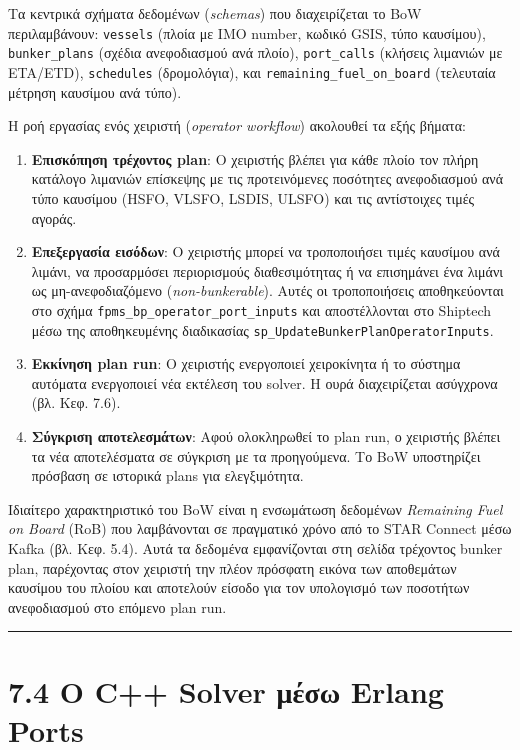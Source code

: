 Τα κεντρικά σχήματα δεδομένων (\emph{schemas}) που διαχειρίζεται το BoW
περιλαμβάνουν: \texttt{vessels} (πλοία με IMO number, κωδικό GSIS, τύπο
καυσίμου), \texttt{bunker\_plans} (σχέδια ανεφοδιασμού ανά πλοίο),
\texttt{port\_calls} (κλήσεις λιμανιών με ETA/ETD), \texttt{schedules}
(δρομολόγια), και \texttt{remaining\_fuel\_on\_board} (τελευταία μέτρηση
καυσίμου ανά τύπο).

Η ροή εργασίας ενός χειριστή (\emph{operator workflow}) ακολουθεί τα
εξής βήματα:

\begin{enumerate}
\def\labelenumi{\arabic{enumi}.}
\item
  \textbf{Επισκόπηση τρέχοντος plan}: Ο χειριστής βλέπει για κάθε πλοίο
  τον πλήρη κατάλογο λιμανιών επίσκεψης με τις προτεινόμενες ποσότητες
  ανεφοδιασμού ανά τύπο καυσίμου (HSFO, VLSFO, LSDIS, ULSFO) και τις
  αντίστοιχες τιμές αγοράς.
\item
  \textbf{Επεξεργασία εισόδων}: Ο χειριστής μπορεί να τροποποιήσει τιμές
  καυσίμου ανά λιμάνι, να προσαρμόσει περιορισμούς διαθεσιμότητας ή να
  επισημάνει ένα λιμάνι ως μη-ανεφοδιαζόμενο (\emph{non-bunkerable}).
  Αυτές οι τροποποιήσεις αποθηκεύονται στο σχήμα
  \texttt{fpms\_bp\_operator\_port\_inputs} και αποστέλλονται στο
  Shiptech μέσω της αποθηκευμένης διαδικασίας
  \texttt{sp\_UpdateBunkerPlanOperatorInputs}.
\item
  \textbf{Εκκίνηση plan run}: Ο χειριστής ενεργοποιεί χειροκίνητα ή το
  σύστημα αυτόματα ενεργοποιεί νέα εκτέλεση του solver. Η ουρά
  διαχειρίζεται ασύγχρονα (βλ. Κεφ. 7.6).
\item
  \textbf{Σύγκριση αποτελεσμάτων}: Αφού ολοκληρωθεί το plan run, ο
  χειριστής βλέπει τα νέα αποτελέσματα σε σύγκριση με τα προηγούμενα. Το
  BoW υποστηρίζει πρόσβαση σε ιστορικά plans για ελεγξιμότητα.
\end{enumerate}

Ιδιαίτερο χαρακτηριστικό του BoW είναι η ενσωμάτωση δεδομένων
\emph{Remaining Fuel on Board} (RoB) που λαμβάνονται σε πραγματικό χρόνο
από το STAR Connect μέσω Kafka (βλ. Κεφ. 5.4). Αυτά τα δεδομένα
εμφανίζονται στη σελίδα τρέχοντος bunker plan, παρέχοντας στον χειριστή
την πλέον πρόσφατη εικόνα των αποθεμάτων καυσίμου του πλοίου και
αποτελούν είσοδο για τον υπολογισμό των ποσοτήτων ανεφοδιασμού στο
επόμενο plan run.

\begin{center}\rule{0.5\linewidth}{0.5pt}\end{center}

\section{7.4 Ο C++ Solver μέσω Erlang
Ports}\label{ux3bf-c-solver-ux3bcux3adux3c3ux3c9-erlang-ports}

